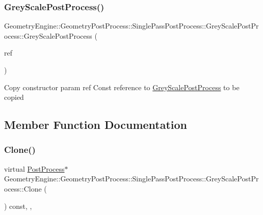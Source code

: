 \subsubsection{\texorpdfstring{GreyScalePostProcess()}{GreyScalePostProcess()}\hspace{0.1cm}{\footnotesize\ttfamily [2/2]}}
{\footnotesize\ttfamily Geometry\+Engine\+::\+Geometry\+Post\+Process\+::\+Single\+Pass\+Post\+Process\+::\+Grey\+Scale\+Post\+Process\+::\+Grey\+Scale\+Post\+Process (\begin{DoxyParamCaption}\item[{const \mbox{\hyperlink{class_geometry_engine_1_1_geometry_post_process_1_1_single_pass_post_process_1_1_grey_scale_post_process}{Grey\+Scale\+Post\+Process}} \&}]{ref }\end{DoxyParamCaption})\hspace{0.3cm}{\ttfamily [inline]}}

Copy constructor param ref Const reference to \mbox{\hyperlink{class_geometry_engine_1_1_geometry_post_process_1_1_single_pass_post_process_1_1_grey_scale_post_process}{Grey\+Scale\+Post\+Process}} to be copied 

\subsection{Member Function Documentation}
\mbox{\label{class_geometry_engine_1_1_geometry_post_process_1_1_single_pass_post_process_1_1_grey_scale_post_process_a36f198711874587c9cbf5c958e6d09ea}} 
\subsubsection{\texorpdfstring{Clone()}{Clone()}}
{\footnotesize\ttfamily virtual \mbox{\hyperlink{class_geometry_engine_1_1_geometry_post_process_1_1_post_process}{Post\+Process}}$\ast$ Geometry\+Engine\+::\+Geometry\+Post\+Process\+::\+Single\+Pass\+Post\+Process\+::\+Grey\+Scale\+Post\+Process\+::\+Clone (\begin{DoxyParamCaption}{ }\end{DoxyParamCaption}) const\hspace{0.3cm}{\ttfamily [inline]}, {\ttfamily [override]}, {\ttfamily [virtual]}}

